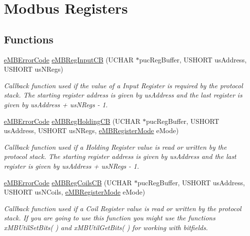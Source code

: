 \hypertarget{group__modbus__registers}{}\section{Modbus Registers}
\label{group__modbus__registers}
\subsection*{Functions}
\begin{DoxyCompactItemize}
\item 
\hyperlink{group__modbus_ga9e7fce8c431cb0e521c67f7f36dd823d}{e\+M\+B\+Error\+Code} \hyperlink{group__modbus__registers_ga7816677520b1eb2ebecf15060a41bc81}{e\+M\+B\+Reg\+Input\+CB} (U\+C\+H\+AR $\ast$puc\+Reg\+Buffer, U\+S\+H\+O\+RT us\+Address, U\+S\+H\+O\+RT us\+N\+Regs)
\begin{DoxyCompactList}\small\item\em Callback function used if the value of a {\itshape Input Register} is required by the protocol stack. The starting register address is given by {\ttfamily us\+Address} and the last register is given by {\ttfamily us\+Address + us\+N\+Regs -\/ 1}. \end{DoxyCompactList}\item 
\hyperlink{group__modbus_ga9e7fce8c431cb0e521c67f7f36dd823d}{e\+M\+B\+Error\+Code} \hyperlink{group__modbus__registers_ga10d37e1d80224bf3b1eeb9e246d7582e}{e\+M\+B\+Reg\+Holding\+CB} (U\+C\+H\+AR $\ast$puc\+Reg\+Buffer, U\+S\+H\+O\+RT us\+Address, U\+S\+H\+O\+RT us\+N\+Regs, \hyperlink{group__modbus_gaf1398cbbeb317b1dbd0276b275f5b0f8}{e\+M\+B\+Register\+Mode} e\+Mode)
\begin{DoxyCompactList}\small\item\em Callback function used if a {\itshape Holding Register} value is read or written by the protocol stack. The starting register address is given by {\ttfamily us\+Address} and the last register is given by {\ttfamily us\+Address + us\+N\+Regs -\/ 1}. \end{DoxyCompactList}\item 
\hyperlink{group__modbus_ga9e7fce8c431cb0e521c67f7f36dd823d}{e\+M\+B\+Error\+Code} \hyperlink{group__modbus__registers_ga88d9b719291515c60eee1bf9ffa1dd02}{e\+M\+B\+Reg\+Coils\+CB} (U\+C\+H\+AR $\ast$puc\+Reg\+Buffer, U\+S\+H\+O\+RT us\+Address, U\+S\+H\+O\+RT us\+N\+Coils, \hyperlink{group__modbus_gaf1398cbbeb317b1dbd0276b275f5b0f8}{e\+M\+B\+Register\+Mode} e\+Mode)
\begin{DoxyCompactList}\small\item\em Callback function used if a {\itshape Coil Register} value is read or written by the protocol stack. If you are going to use this function you might use the functions x\+M\+B\+Util\+Set\+Bits(  ) and x\+M\+B\+Util\+Get\+Bits(  ) for working with bitfields. \end{DoxyCompactList}\item 

\end{DoxyCompactItemize}
